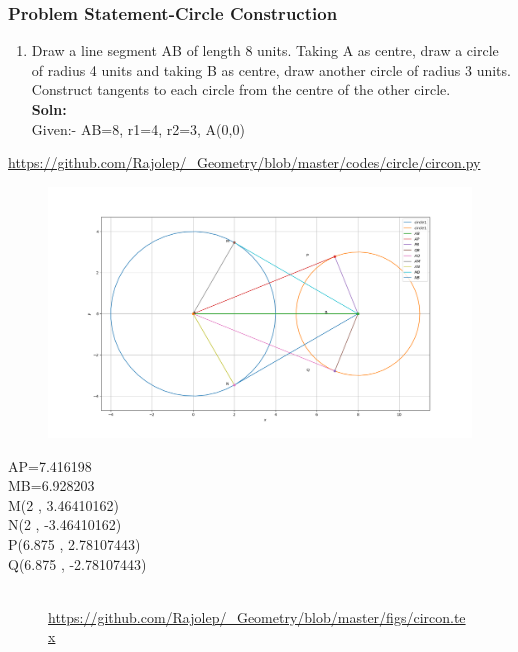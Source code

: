 \begin{frame}
\frametitle{Problem Statement-Circle Construction}
\begin{enumerate}[label=(\roman*)]
\item Draw a line segment AB of length 8 units. Taking A as centre, draw a circle of radius 4 units and taking B as centre, draw another circle of radius 3 units. Construct tangents to each circle from the centre of the other circle.\\
\textbf{Soln:}\\
Given:- AB=8, r1=4, r2=3, A(0,0)\\
\end{enumerate}
\url{https://github.com/Rajolep/_Geometry/blob/master/codes/circle/circon.py}
\begin{figure}
\includegraphics[scale=0.15]{./figs/circon.png}
\end{figure}
\end{frame}
\begin{frame}
AP=7.416198\\
MB=6.928203\\
M(2 , 3.46410162)\\
N(2 , -3.46410162)\\
P(6.875 , 2.78107443)\\
Q(6.875 , -2.78107443)\\
\begin{figure}
\\
\url{https://github.com/Rajolep/_Geometry/blob/master/figs/circon.tex}

\end{figure}
\end{frame}